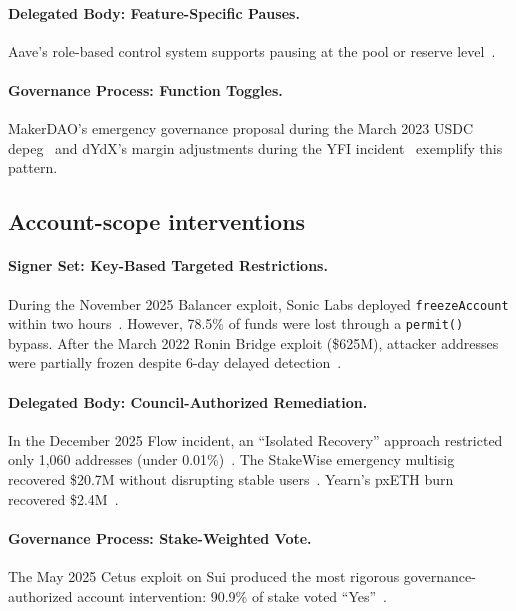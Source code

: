 \documentclass[12pt]{article}
\begin{document}
\paragraph{Delegated Body: Feature-Specific Pauses.}
Aave's role-based control system supports pausing at the pool or reserve level~\cite{AaveACLManager,AaveDPIFreezeProposal}.

\paragraph{Governance Process: Function Toggles.}
MakerDAO's emergency governance proposal during the March 2023 USDC depeg~\cite{MakerDAOEmergency2023} and dYdX's margin adjustments during the YFI incident~\cite{dYdXSushiYFI} exemplify this pattern.

\subsection{Account-scope interventions}
\label{sec:incidents-account}

\paragraph{Signer Set: Key-Based Targeted Restrictions.}
During the November 2025 Balancer exploit, Sonic Labs deployed \texttt{freezeAccount} within two hours~\cite{Sonic2025Freeze}. However, 78.5\% of funds were lost through a \texttt{permit()} bypass. After the March 2022 Ronin Bridge exploit (\$625M), attacker addresses were partially frozen despite 6-day delayed detection~\cite{Ronin2022Exploit}.

\paragraph{Delegated Body: Council-Authorized Remediation.}
In the December 2025 Flow incident, an ``Isolated Recovery'' approach restricted only 1,060 addresses (under 0.01\%)~\cite{FlowPostmortem2026,Flow2025Recovery}. The StakeWise emergency multisig recovered \$20.7M without disrupting stable users~\cite{StakeWise2025Recovery}. Yearn's pxETH burn recovered \$2.4M~\cite{Yearn2025Recovery}.

\paragraph{Governance Process: Stake-Weighted Vote.}
The May 2025 Cetus exploit on Sui produced the most rigorous governance-authorized account intervention: 90.9\% of stake voted ``Yes''~\cite{SuiCetusVote,UnchainedCetus2025}.
\end{document}
